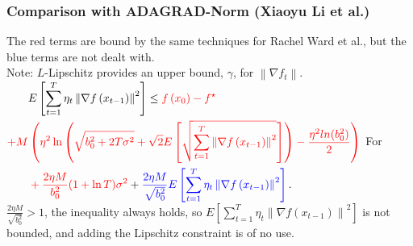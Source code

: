 \documentclass{beamer}
\begin{document}
\begin{frame}
\frametitle{Comparison with ADAGRAD-Norm (Xiaoyu Li et al.)}
The red terms are bound by the same techniques for Rachel Ward et al., but the blue terms are not dealt with. \\Note: $L$-Lipschitz provides an upper bound, $\gamma$, for $\left\|\nabla f_t\right\|$. 
\\
$\begin{aligned} & E\left[\sum_{t=1}^T \eta_t\left\|\nabla f\left(x_{t-1}\right)\right\|^2\right] \leq \color{red} f\left(x_0\right)-f^{\star} \\  \color{red}+M &\color{red}\left(\eta^2 \ln \left(\sqrt{b_0^2+2 T \sigma^2}+\sqrt{2} E\left[\sqrt{\sum_{t=1}^T \left\|\nabla f\left(x_{t-1}\right)\right\|^2}\right]\right)-\frac{\eta^2 ln(b_0^2)}{2}\right) \\ &\color{red} +\frac{2 \eta M}{b_0^2}(1+\ln T) \sigma^2\color{black} +\color{blue}\frac{2 \eta M}{\sqrt{b_0^2}} E\left[\sum_{t=1}^T \eta_t\left\|\nabla f\left(x_{t-1}\right)\right\|^2\right]\color{black}.\end{aligned}$
For $\frac{2 \eta M}{\sqrt{b_0^2}} > 1$, the inequality always holds, so $E\left[\sum_{t=1}^T \eta_t\left\|\nabla f\left(x_{t-1}\right)\right\|^2\right]$ is not bounded, and adding the Lipschitz constraint is of no use.
\end{frame}
\end{document}
